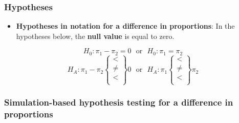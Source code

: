 \documentclass[
]{report}
\providecommand{\tightlist}{%
  \setlength{\itemsep}{0pt}\setlength{\parskip}{0pt}}
\begin{document}
\subsubsection*{Hypotheses}\label{hypotheses-1}

\begin{itemize}
\tightlist
\item
  \textbf{Hypotheses in notation for a difference in proportions}: In the hypotheses below, the \textbf{null value} is equal to zero.
\end{itemize}

\[H_0: \pi_1-\pi_2 = 0 ~~~ \text{or}~~~ H_0: \pi_1 = \pi_2\]
\[H_A: \pi_1-\pi_2 \left\{
\begin{array}{ll}
< \\
\ne \\
< \\
\end{array}
\right\}
0 
~~~ \text{or}~~~
H_A: \pi_1 \left\{
\begin{array}{ll}
< \\
\ne \\
< \\
\end{array}
\right\}
\pi_2 \]

\subsubsection*{Simulation-based hypothesis testing for a difference in proportions}\label{simulation-based-hypothesis-testing-for-a-difference-in-proportions}
\end{document}
